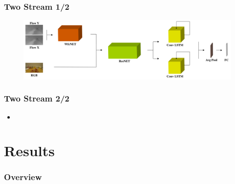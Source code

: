 \documentclass{beamer}
\begin{document}
\begin{frame}
\frametitle{Two Stream 1/2}

\begin{figure}
\centering
\includegraphics[width=\textwidth]{../schemi/two_stream}
\end{figure}
 
\end{frame}

\begin{frame}
\frametitle{Two Stream 2/2}

\begin{itemize}
\item
\end{itemize}
 
\end{frame}
  
\section{Results}

\begin{frame}
\frametitle{Overview} 
	\tableofcontents[currentsection]
\end{frame}
\end{document}
